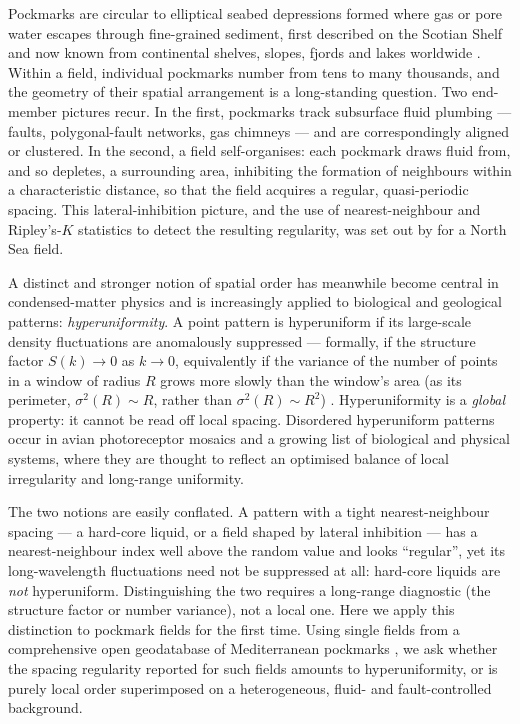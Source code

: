 \documentclass[11pt]{article}
\begin{document}
Pockmarks are circular to elliptical seabed depressions formed where gas or pore
water escapes through fine-grained sediment, first described on the Scotian
Shelf \citep{king1970} and now known from continental shelves, slopes, fjords
and lakes worldwide \citep{hovland1988}. Within a field, individual pockmarks
number from tens to many thousands, and the geometry of their spatial
arrangement is a long-standing question. Two end-member pictures recur. In the
first, pockmarks track subsurface fluid plumbing --- faults, polygonal-fault
networks, gas chimneys --- and are correspondingly aligned or clustered. In the
second, a field self-organises: each pockmark draws fluid from, and so depletes,
a surrounding area, inhibiting the formation of neighbours within a
characteristic distance, so that the field acquires a regular, quasi-periodic
spacing. This lateral-inhibition picture, and the use of nearest-neighbour and
Ripley's-$K$ statistics to detect the resulting regularity, was set out by
\citet{hammer2009} for a North Sea field.

A distinct and stronger notion of spatial order has meanwhile become central in
condensed-matter physics and is increasingly applied to biological and
geological patterns: \emph{hyperuniformity}. A point pattern is hyperuniform if
its large-scale density fluctuations are anomalously suppressed --- formally, if
the structure factor $S(k)\!\to\!0$ as $k\!\to\!0$, equivalently if the variance
of the number of points in a window of radius $R$ grows more slowly than the
window's area (as its perimeter, $\sigma^2(R)\sim R$, rather than $\sigma^2(R)
\sim R^2$) \citep{torquato2003,torquato2018}. Hyperuniformity is a \emph{global}
property: it cannot be read off local spacing. Disordered hyperuniform patterns
occur in avian photoreceptor mosaics \citep{jiao2014} and a growing list of
biological and physical systems, where they are thought to reflect an optimised
balance of local irregularity and long-range uniformity.

The two notions are easily conflated. A pattern with a tight nearest-neighbour
spacing --- a hard-core liquid, or a field shaped by lateral inhibition --- has a
nearest-neighbour index well above the random value and looks ``regular'', yet
its long-wavelength fluctuations need not be suppressed at all: hard-core
liquids are \emph{not} hyperuniform. Distinguishing the two requires a
long-range diagnostic (the structure factor or number variance), not a local
one. Here we apply this distinction to pockmark fields for the first time. Using
single fields from a comprehensive open geodatabase of Mediterranean pockmarks
\citep{spatola2025}, we ask whether the spacing regularity reported for such
fields amounts to hyperuniformity, or is purely local order superimposed on a
heterogeneous, fluid- and fault-controlled background.
\end{document}

